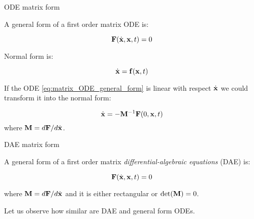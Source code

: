 \documentclass{beamer}
\begin{document}
\begin{frame}{ODE matrix form}
	\begin{flushleft}
		
		A general form of a first order matrix ODE is:
		
		\begin{equation}
			\label{eq:matrix_ODE_general_form}
			\mathbf{F}(\dot{\mathbf{x}}, \mathbf{x}, t) = 0
		\end{equation}
		
		\bigskip
		
		Normal form is:
		
		\begin{equation}
			\dot{\mathbf{x}} = \mathbf{f}(\mathbf{x}, t)
		\end{equation}
	
		If the ODE \eqref{eq:matrix_ODE_general_form} is linear with respect $\dot{\mathbf{x}}$ we could transform it into the normal form:
		
		\begin{equation}
			\dot{\mathbf{x}} = - \mathbf{M}^{-1} \mathbf{F}(0, \mathbf{x}, t) 
		\end{equation}
		where $ \mathbf{M} = d\mathbf{F} / d\dot{\mathbf{x}}$.
	
	\end{flushleft}
\end{frame}




\begin{frame}{DAE matrix form}
	\begin{flushleft}
		
		A general form of a first order matrix \emph{differential-algebraic equations} (DAE) is:
		
		\begin{equation}
			\mathbf{F}(\dot{\mathbf{x}}, \mathbf{x}, t) = 0
		\end{equation}
		
		where $\mathbf{M} = d\mathbf{F} / d\dot{\mathbf{x}}$ and it is either rectangular or $\text{det} (\mathbf{M}) = 0$.
		
		\bigskip
		
		\textcolor{mygrey}{
		Let us observe how similar are DAE and general form ODEs.}
		
	\end{flushleft}
\end{frame}
\end{document}
